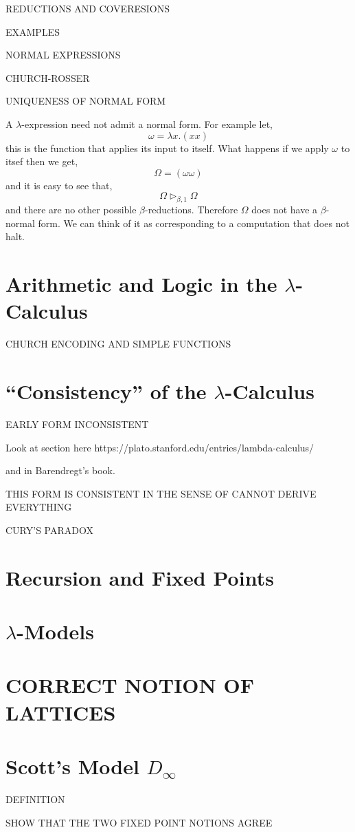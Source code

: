 \documentclass[12pt]{article}
\newcommand{\red}{\triangleright}
\newcommand{\bredo}{\red_{\beta,1}}
\begin{document}
\begin{defn}
REDUCTIONS AND COVERESIONS
\end{defn}

EXAMPLES

NORMAL EXPRESSIONS 

CHURCH-ROSSER 

UNIQUENESS OF NORMAL FORM

\begin{example}
A $\lambda$-expression need not admit a normal form. For example let,
\[ \omega = \lambda x . (x x) \]
this is the function that applies its input to itself. What happens if we apply $\omega$ to itsef then we get,
\[ \Omega = (\omega \omega) \]
and it is easy to see that,
\[ \Omega \bredo \Omega \]
and there are no other possible $\beta$-reductions. Therefore $\Omega$ does not have a $\beta$-normal form. We can think of it as corresponding to a computation that does not halt.
\end{example}

\section{Arithmetic and Logic in the $\lambda$-Calculus}

CHURCH ENCODING AND SIMPLE FUNCTIONS

\section{``Consistency'' of the $\lambda$-Calculus}

EARLY FORM INCONSISTENT

Look at section here https://plato.stanford.edu/entries/lambda-calculus/

and in Barendregt's book. 

THIS FORM IS CONSISTENT IN THE SENSE OF CANNOT DERIVE EVERYTHING

CURY'S PARADOX

\section{Recursion and Fixed Points}

\section{$\lambda$-Models}

\section{CORRECT NOTION OF LATTICES}

\section{Scott's Model $D_{\infty}$}

DEFINITION

SHOW THAT THE TWO FIXED POINT NOTIONS AGREE
\end{document}
